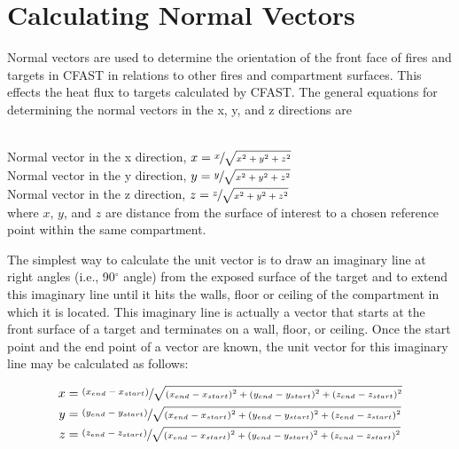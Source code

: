 \section{Calculating Normal Vectors}

Normal vectors are used to determine the orientation of the front face of fires and targets in CFAST in relations to other fires and compartment surfaces. This effects the heat flux to targets calculated by CFAST. The general equations for determining the normal vectors in the x, y, and z directions are \\~

Normal vector in the x direction, $x = \sfrac{x}{\sqrt{x^2 + y^2 + z^2}}$ \\

Normal vector in the y direction, $y = \sfrac{y}{\sqrt{x^2 + y^2 + z^2}}$ \\

Normal vector in the z direction, $z = \sfrac{z}{\sqrt{x^2 + y^2 + z^2}}$ \\
where $x$, $y$, and $z$ are distance from the surface of interest to a chosen reference point within the same compartment.

The simplest way to calculate the unit vector is to draw an imaginary line at right angles (i.e., 90$^\circ$ angle) from the exposed surface of the target and to extend this imaginary line until it hits the walls, floor or ceiling of the compartment in which it is located.  This imaginary line is actually a vector that starts at the front surface of a target and terminates on a wall, floor, or ceiling.  Once the start point and the end point of a vector are known, the unit vector for this imaginary line may be calculated as follows:

\begin{equation}
  \begin{aligned}
 x &= \sfrac{{ \left( {x_{end} - x_{start}} \right) }}{\sqrt{{ \left( {x_{end} - x_{start}} \right) }^2 + { \left( {y_{end} - y_{start}} \right) }^2 + { \left( {z_{end} - z_{start}} \right) }^2}} \\
 y &= \sfrac{{ \left( {y_{end} - y_{start}} \right) }}{\sqrt{{ \left( {x_{end} - x_{start}} \right) }^2 + { \left( {y_{end} - y_{start}} \right) }^2 + { \left( {z_{end} - z_{start}} \right) }^2}} \\
 z &= \sfrac{{ \left( {z_{end} - z_{start}} \right) }}{\sqrt{{ \left( {x_{end} - x_{start}} \right) }^2 + { \left( {y_{end} - y_{start}} \right) }^2 + { \left( {z_{end} - z_{start}} \right) }^2}}
  \end{aligned}
\end{equation}

